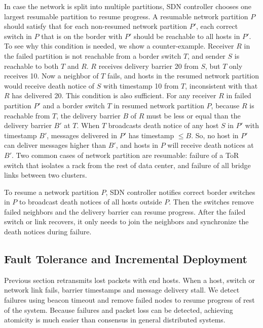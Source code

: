 {In case the network is split into multiple partitions, SDN controller chooses one largest resumable partition to resume progress.
A resumable network partition $P$ should satisfy that for each non-resumed network partition $P'$, each correct switch in $P$ that is on the border with $P'$ should be reachable to all hosts in $P'$.
To see why this condition is needed, we show a counter-example.
Receiver $R$ in the failed partition is not reachable from a border switch $T$, and sender $S$ is reachable to both $T$ and $R$.
$R$ receives delivery barrier 20 from $S$, but $T$ only receives 10.
Now a neighbor of $T$ fails, and hosts in the resumed network partition would receive death notice of $S$ with timestamp 10 from $T$, inconsistent with that $R$ has delivered 20.
This condition is also sufficient.
For any receiver $R$ in failed partition $P'$ and a border switch $T$ in resumed network partition $P$, because $R$ is reachable from $T$, the delivery barrier $B$ of $R$ must be less or equal than the delivery barrier $B'$ at $T$.
When $T$ broadcasts death notice of any host $S$ in $P'$ with timestamp $B'$, messages delivered in $P'$ has timestamp $\le B$.
So, no host in $P'$ can deliver messages higher than $B'$, and hosts in $P$ will receive death notices at $B'$.
Two common cases of network partition are resumable: failure of a ToR switch that isolates a rack from the rest of data center, and failure of all bridge links between two clusters.

To resume a network partition $P$, SDN controller notifies correct border switches in $P$ to broadcast death notices of all hosts outside $P$.
Then the switches remove failed neighbors and the delivery barrier can resume progress.
After the failed switch or link recovers, it only needs to join the neighbors and synchronize the death notices during failure.



\iffalse
\subsection{Fault Tolerance and Incremental Deployment}
\label{sec:failure}

Previous section retransmits lost packets with end hosts.
When a host, switch or network link fails, barrier timestamps and message delivery stall.
We detect failures using beacon timeout and remove failed nodes to resume progress of rest of the system.
Because failures and packet loss can be detected, achieving atomicity is much easier than consensus in general distributed systems.

}
